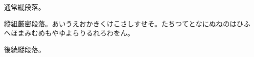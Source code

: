 \documentclass[pdflatex,tate]{jlreq}
\begin{document}
通常縦段落。
\begin{ptjparagraph}
縦組厳密段落。あいうえおかきくけこさしすせそ。たちつてとなにぬねのはひふへほまみむめもやゆよらりるれろわをん。
\end{ptjparagraph}
後続縦段落。
\makeatletter
{}
\makeatother
\end{document}
